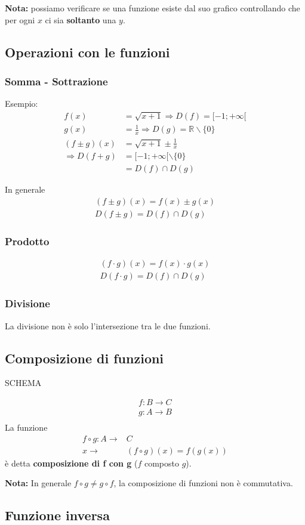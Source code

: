\documentclass[../main.tex]{subfiles}
\begin{document}
\textbf{Nota:} possiamo verificare se una funzione esiste dal suo grafico controllando che per ogni $x$ ci sia \textbf{soltanto} una $y$.
\vspace{1cm}


\subsection{Operazioni con le funzioni}
\subsubsection{Somma - Sottrazione}
Esempio:
\begin{align*}
    f(x)&=\sqrt{x+1} \Rightarrow D(f)=\lbrack-1;+\infty\lbrack \\
    g(x)&=\frac{1}{x}\Rightarrow D(g)=\mathbb{R} \backslash \{0\} \\
    (f\pm g)(x)&=\sqrt{x+1}\pm \frac{1}{x} \\
    \Rightarrow D(f+g)&=\lbrack-1;+\infty\lbrack \backslash \{0\} \\
    &=D(f)\cap D(g)
\end{align*}

In generale
\begin{align*}
    (f\pm g)(x) = f(x)\pm g(x)\\
    D(f\pm g) = D(f) \cap D(g) 
\end{align*}

\subsubsection{Prodotto}
\begin{align*}
    (f \cdot g)(x) = f(x) \cdot g(x) \\
    D(f \cdot g) = D(f) \cap D(g)  
\end{align*}

\subsubsection{Divisione}
La divisione non è solo l'intersezione tra le due funzioni.

\pagebreak
\subsection{Composizione di funzioni}
SCHEMA

\begin{align*}
    f: B \longrightarrow C \\
    g: A \longrightarrow B \\
\end{align*}
La funzione
\begin{align*}
    f \circ  g: A \longrightarrow& C \\
    x \longrightarrow& (f \circ  g)(x) = f(g(x))
\end{align*}
è detta \textbf{composizione di f con g} ($f$ composto $g$).

\textbf{Nota:} In generale $f \circ g \neq g \circ  f $, la composizione di funzioni non è commutativa. 

\subsection{Funzione inversa}
\end{document}
